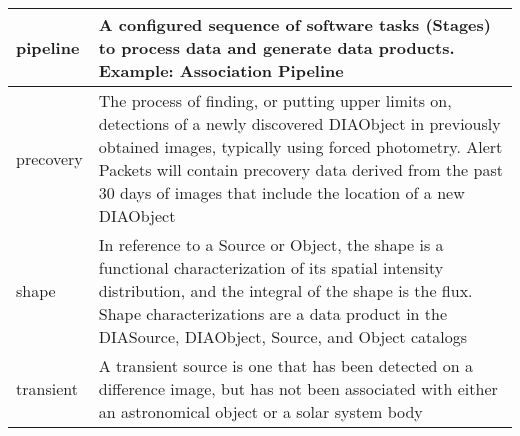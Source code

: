 \begin{longtable}{|p{}|p{}|}
pipeline & A configured sequence of software tasks (Stages) to process data and generate data products. Example: \gls{Association Pipeline} \\\hline
precovery & The process of finding, or putting upper limits on, detections of a newly discovered \gls{DIAObject} in previously obtained images, typically using \gls{forced photometry}. \gls{Alert} Packets will contain \gls{precovery} data derived from the past 30 days of images that include the location of a new \gls{DIAObject} \\\hline
shape & In reference to a \gls{Source} or Object, the \gls{shape} is a functional characterization of its spatial intensity distribution, and the integral of the \gls{shape} is the \gls{flux}. Shape characterizations are a data product in the \gls{DIASource}, \gls{DIAObject}, \gls{Source}, and Object catalogs \\\hline
transient & A \gls{transient} source is one that has been detected on a difference image, but has not been associated with either an \gls{astronomical object} or a solar system body \\\hline
\end{longtable}
